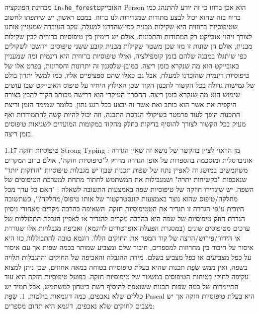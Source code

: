       מבחינת הפונקציה \verb+inₜhe_forest+האובייקט Person הוא אכן ברווז כי זה
      יודע להתנהג כמו ברווז בזה שהוא יכול לבצע מתודות שמגדירות לנו ברווז. במבט
      ראשון, יש שיתפתו לחשוב שטיפוסיות ברווזית היא שקילות מבנית כפי שהדרנו
      למעלה, עקב העובדה שמעניין אותנו לצורך זיהוי אובייקט רק המתודות והתכונות.
      אולם יש דימיון בין טיפוסיות ברווזית לבין שקילות מבנית, אולם הן שונות זו
      מזו שכן משטר שקילות מבנית קובע ששני טיפוסים ייחשבו לשקולים כפי שיתגלו
      במבנה שלהם בזמן קומפילציה, ואילו טיפוסיות ברווזית היא דינמית ומה שמעניין
      באובייקט הוא מה שנקרא בזמן ריצה. כמובן שלסגנון זה יתרונות וחסרונות, בפרט
      אלו של טיפוסיות דינמית שהזכרנו למעלה, אבל גם כאלו שהם ספציפיים אליו, כמו
      למשל יתרון בולט של גמישות גדולה בכל הקשור לתכנון הקוד שכן האילוץ היחיד על
      טיפוס האובייקט שבו עושים שימוש הוא מה שנקרא בזמן ריצה. החסרון העיקרי הוא
      דרישה מכותב הקוד להבין בצורה היקפית את אשר הוא כותב ואת אשר זה יבצע בכל
      רגע נתון, כלומר שמימד הזמן וריצת התכנות הופך לעוד פרמטר בשיקולי הנדסת
      התכנה, וזה יכול להיות קשה להתמודדות ואף מעיק בכל הקשור לצורך להוסיף
      בדיקות כחלק מהקוד במקומות המועדים לשגיאות טיפוסים בזמן ריצה.

      1.17 טיפוסיות חזקה Strong Typing : מן הראוי לציין בהקשר של נושא זה שאין
      הגדרה אוניברסלית ומוסכמה בהספרות על אופן הגדרה מדויק ל"טיפוסיות חזקה",
      אולם ברוב המקרים משתמשים במושג זה לאפיין נתח של שפות תכנות שבןו יש מגבלות
      טיפוסיות "הדוקות יותר" שנאכפות "בקשיחות יתרה" ושמגבילות את המשתמש לחתור
      מתחת למערכת הטיפוסים של השפה. יש שיגדירו חוזקה של טיפוסיות שפה באמצעות
      התשובה לשאלה : "האם כל ערך מכל מחלקה/טיפוס שהוא נוצר באמצעות קונסטרקטור
      של אותו טיפוס/מחלקה?", כשתשובה חיובית ע"פי הגדרה זו תגדיר את הטטיפוסיות
      חזקה. השאיפה בהרבה מקרים מאחורי ניסיון הגדרת חוזק טיפוסיות של שפה היא
      בהרבה מקרים להגדיר או לאפיין הגבלת התבוללות של ערכים מטיפוסים שונים
      (במסגרת הפעלת אופרטורים לדוגמא) ואכיפת מגבלויות אלו שגוררת אי
      הידור/פירוש/הרצה של קוד המפר את החוקים הללו.
      דוגמא טובה להתבוללות כזו היא איסור על חיבור בין מחרוזות למספרים, חיבור שלם ומצביע שמותר בכמה שפות אך עם איסור על כפל מצביעים או כפל מצביע בשלם.
      מידת ההגבלה והאכיפה של החוקים וההגבלות תלויה בשפה, ואין ממש שְׂפַת תכנות שהיא בעלת טיפוסיות בטוחה במאה אחוזים, שכן ניתן למצוא עקיפה לחוקי בטיחות הטיפוסים במשטר של טיפוסיות חזקה.
      בפועל טיפוסיות חזקה היא עוד התיימרות של כמה שפות תכנות ששואפת להוסיף רשת ביטחון למשתמש, אבל תמיד יש כללים שלא נאכפים, כמה דוגמאות בולטות:
      1. שְׂפַת Pascal היא בעלת טיפוסיות חזקה אך יש מצבים לחוקים שלא נאכפים, דוגמא היא תחום מספרים:

